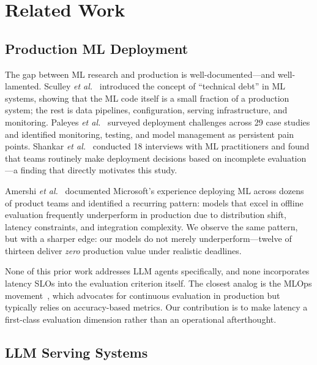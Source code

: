\documentclass[11pt]{article}
\newcommand{\etal}{\textit{et al.}}
\begin{document}
\section{Related Work}
\label{sec:related}

\subsection{Production ML Deployment}

The gap between ML research and production is well-documented---and well-lamented. Sculley \etal~\cite{sculley2015debt} introduced the concept of ``technical debt'' in ML systems, showing that the ML code itself is a small fraction of a production system; the rest is data pipelines, configuration, serving infrastructure, and monitoring. Paleyes \etal~\cite{paleyes2022challenges} surveyed deployment challenges across 29 case studies and identified monitoring, testing, and model management as persistent pain points. Shankar \etal~\cite{shankar2022operationalizing} conducted 18 interviews with ML practitioners and found that teams routinely make deployment decisions based on incomplete evaluation---a finding that directly motivates this study.

Amershi \etal~\cite{amershimultiversion2019} documented Microsoft's experience deploying ML across dozens of product teams and identified a recurring pattern: models that excel in offline evaluation frequently underperform in production due to distribution shift, latency constraints, and integration complexity. We observe the same pattern, but with a sharper edge: our models do not merely underperform---twelve of thirteen deliver \emph{zero} production value under realistic deadlines.

None of this prior work addresses LLM agents specifically, and none incorporates latency SLOs into the evaluation criterion itself. The closest analog is the MLOps movement~\cite{kreuzberger2023mlops}, which advocates for continuous evaluation in production but typically relies on accuracy-based metrics. Our contribution is to make latency a first-class evaluation dimension rather than an operational afterthought.

\subsection{LLM Serving Systems}
\end{document}
